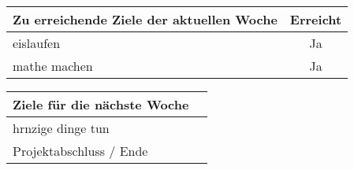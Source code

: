 \begin{tabularx}{\textwidth}{Xc}
    \arrayrulecolor{OliveGreen}
    \toprule
    {\bfseries Zu erreichende Ziele der aktuellen Woche} & {\bfseries Erreicht} \\
    \midrule[2pt]
    eislaufen                                            &Ja                    \\
    \rowcolor{OliveGreen!15}
    mathe machen                                         &Ja                    \\
    \bottomrule[2pt]
\end{tabularx}
%
\vspace{1cm}
%
\begin{tabularx}{\textwidth}{Xc}
    \arrayrulecolor{OliveGreen}
    \toprule
    {\bfseries Ziele für die nächste Woche}              &                      \\
    \midrule[2pt]
    hrnzige dinge tun                                    &                      \\
    \rowcolor{OliveGreen!15}
    Projektabschluss / Ende                              &                      \\
\end{tabularx}
